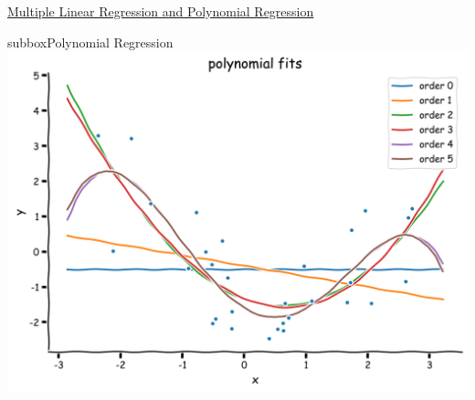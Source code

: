 \begin{textbox}{\href{https://compneuro.neuromatch.io/tutorials/W1D2_ModelFitting/student/W1D2_Tutorial4.html}{Multiple Linear Regression and Polynomial Regression }   }
\begin{subbox}{subbox}{Polynomial Regression}
\centering
\includegraphics[scale=0.1]{Figures/ModelFitting/MFFigure4.png}
\end{subbox}
\end{textbox}
